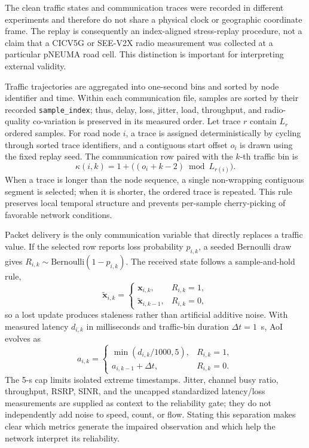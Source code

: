 \documentclass[pdflatex,sn-mathphys-num]{sn-jnl}%
\newenvironment{changed}{}{}
\theoremstyle{thmstyleone}%
\theoremstyle{thmstyletwo}%
\theoremstyle{thmstylethree}%
\begin{document}
\begin{changed}
The clean traffic states and communication traces were recorded in different experiments and therefore do not share a physical clock or geographic coordinate frame. The replay is consequently an index-aligned stress-replay procedure, not a claim that a CICV5G or SEE-V2X radio measurement was collected at a particular pNEUMA road cell. This distinction is important for interpreting external validity.

Traffic trajectories are aggregated into one-second bins and sorted by node identifier and time. Within each communication file, samples are sorted by their recorded \texttt{sample\_index}; thus, delay, loss, jitter, load, throughput, and radio-quality co-variation is preserved in its measured order. Let trace \(r\) contain \(L_r\) ordered samples. For road node \(i\), a trace is assigned deterministically by cycling through sorted trace identifiers, and a contiguous start offset \(o_i\) is drawn using the fixed replay seed. The communication row paired with the \(k\)-th traffic bin is
\begin{equation}
    \kappa(i,k)=1+\bigl((o_i+k-2)\bmod L_{r(i)}\bigr).
\end{equation}
When a trace is longer than the node sequence, a single non-wrapping contiguous segment is selected; when it is shorter, the ordered trace is repeated. This rule preserves local temporal structure and prevents per-sample cherry-picking of favorable network conditions.

Packet delivery is the only communication variable that directly replaces a traffic value. If the selected row reports loss probability \(p_{i,k}\), a seeded Bernoulli draw gives \(R_{i,k}\sim\mathrm{Bernoulli}(1-p_{i,k})\). The received state follows a sample-and-hold rule,
\begin{equation}
\widetilde{\mathbf{x}}_{i,k}=
\begin{cases}
\mathbf{x}_{i,k}, & R_{i,k}=1,\\
\widetilde{\mathbf{x}}_{i,k-1}, & R_{i,k}=0,
\end{cases}
\end{equation}
so a lost update produces staleness rather than artificial additive noise. With measured latency \(d_{i,k}\) in milliseconds and traffic-bin duration \(\Delta t=1\)~s, AoI evolves as
\begin{equation}
a_{i,k}=
\begin{cases}
\min(d_{i,k}/1000,5), & R_{i,k}=1,\\
a_{i,k-1}+\Delta t, & R_{i,k}=0.
\end{cases}
\end{equation}
The 5-s cap limits isolated extreme timestamps. Jitter, channel busy ratio, throughput, RSRP, SINR, and the uncapped standardized latency/loss measurements are supplied as context to the reliability gate; they do not independently add noise to speed, count, or flow. Stating this separation makes clear which metrics generate the impaired observation and which help the network interpret its reliability.


\end{changed}
\end{document}
